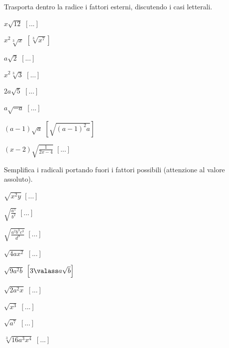 \begin{esercizio}[*]
\label{ese:2.41}
Trasporta dentro la radice i fattori esterni, discutendo i casi letterali.
\begin{htmulticols}{3}
\begin{enumeratea}
\item \(x\sqrt{12}\)
\hfill \(\left[...\right]\)
\item \(x^2\sqrt[3]x\)
\hfill \(\left[\sqrt[3]{x^7}\right]\)
\item \(a\sqrt 2\)
\hfill \(\left[...\right]\)
\item \(x^2\sqrt[3]3\)
\hfill \(\left[...\right]\)
\item \(2a\sqrt 5\)
\hfill \(\left[...\right]\)
\item \(a\sqrt{-a}\)
\hfill \(\left[...\right]\)
\item \((a-1)\sqrt a\)
\hfill \(\left[\sqrt{(a-1)^2a}\right]\)
\item \((x-2)\sqrt{\frac 1{2x-4}}\)
\hfill \(\left[...\right]\)
\end{enumeratea}
\end{htmulticols}
\end{esercizio}

\begin{esercizio}[*]
\label{ese:2.44}
Semplifica i radicali portando fuori i fattori possibili 
(attenzione al valore assoluto).
\begin{htmulticols}{3}
\begin{enumeratea}
\item \(\sqrt{x^2y}\)
\hfill \(\left[...\right]\)
\item \(\sqrt{\frac{a^5}{b^2}}\)
\hfill \(\left[...\right]\)
\item \(\sqrt{\frac{a^2b^3c^3}{d^9}}\)
\hfill \(\left[...\right]\)
\item \(\sqrt{4ax^2}\)
\hfill \(\left[...\right]\)
\item \(\sqrt{9a^2b}\)
\hfill \(\left[3\valass a\sqrt{b}\right]\)
\item \(\sqrt{2a^2x}\)
\hfill \(\left[...\right]\)
\item \(\sqrt{x^3}\)
\hfill \(\left[...\right]\)
\item \(\sqrt{a^7}\)
\hfill \(\left[...\right]\)
\item \(\sqrt[3]{16a^3x^4}\)
\hfill \(\left[...\right]\)
\end{enumeratea}
\end{htmulticols}
\end{esercizio}

